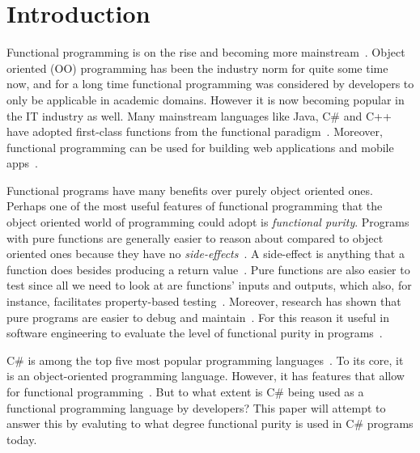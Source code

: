 \documentclass[a4paper,12pt]{article}
\begin{document}
\tableofcontents


\cleardoublepage

\mainmatter

\section{Introduction} \label{sec:Introduction}

Functional programming is on the rise and becoming more mainstream~\cite{intertech}. Object oriented (OO) programming has been the industry norm for quite some time now, and for a long time functional programming was considered by developers to only be applicable in academic domains. However it is now becoming popular in the IT industry as well. Many mainstream languages like Java, C\# and C++ have adopted first-class functions from the functional paradigm~\cite{intertech}. Moreover, functional programming can be used for building web applications and mobile apps~\cite{jonas-walter}.

Functional programs have many benefits over purely object oriented ones. Perhaps one of the most useful features of functional programming that the object oriented world of programming could adopt is \textit{functional purity}. Programs with pure functions are generally easier to reason about compared to object oriented ones because they have no \textit{side-effects}~\cite{alvin-alexander}. A side-effect is anything that a function does besides producing a return value~\cite{purity-in-javascript}. Pure functions are also easier to test since all we need to look at are functions' inputs and outputs, which also, for instance, facilitates property-based testing~\cite{alvin-alexander}.  Moreover, research has shown that pure programs are easier to debug and maintain~\cite{purity-in-javascript}. %
For this reason it useful in software engineering to evaluate the level of functional purity in programs~\cite{purity-in-javascript}.

C\# is among the top five most popular programming languages~\cite{tiobe}. To its core, it is an object-oriented programming language. However, it has features that allow for functional programming~\cite{hamid-mosalla}. But to what extent is C\# being used as a functional programming language by developers? This paper will attempt to answer this by evaluting to what degree functional purity is used in C\# programs today.
\end{document}
